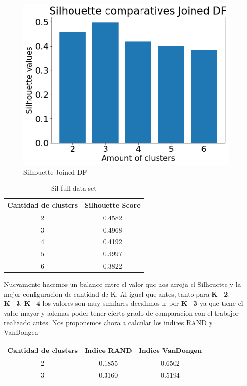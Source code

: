 \begin{figure}[H]
    \centering
    \includegraphics[width=\textwidth]{img/imagenes/jerarquico_AA/silhouette_joinedDF.png}
    \caption{Silhouette Joined DF}
    \label{fig:silJoinedDF}
\end{figure}

\begin{table}[H]
    \centering
    \begin{tabular}{|c|c|}
    	\hline
        Cantidad de clusters & Silhouette Score \\
        \hline
        2 & 0.4582\\
        3 & 0.4968\\
        4 & 0.4192\\
        5 & 0.3997\\
        6 & 0.3822\\
        \hline
    \end{tabular}
    \caption{Sil full data set}
    \label{tab:sil-fullds}
\end{table}

Nuevamente hacemos un balance entre el valor que nos arroja el Silhouette y la mejor configuracion de cantidad de K. Al igual que antes, tanto para \textbf{K=2}, \textbf{K=3}, \textbf{K=4} los valores son muy similares decidimos ir por \textbf{K=3} ya que tiene el valor mayor y ademas poder tener cierto grado de comparacion con el trabajor realizado antes.
Nos proponemos ahora a calcular los indices RAND y VanDongen

\begin{table}[H]
	\centering
	\begin{tabular}{ |c|c|c| }
		\hline
 		Cantidad de clusters & Indice RAND & Indice VanDongen\\
 		\hline
		 2 & 0.1855 & 0.6502\\
         3 & 0.3160 & 0.5194\\
         \hline
	\end{tabular}
     \label{tab:rand-ds}
\end{table}

